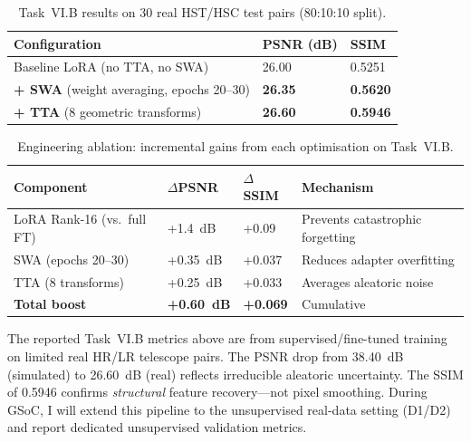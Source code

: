 \documentclass[11pt,a4paper]{article}
\begin{document}
\begin{table}[h!]
\centering
\caption{Task~VI.B results on 30 real HST/HSC test pairs (80:10:10 split).}
\label{tab:6b_main}
\begin{tabular}{L{5.5cm} C{3.0cm} C{3.0cm}}
\toprule
\textbf{Configuration} & \textbf{PSNR (dB)} & \textbf{SSIM} \\
\midrule
Baseline LoRA (no TTA, no SWA) & 26.00 & 0.5251 \\
\textbf{+ SWA} (weight averaging, epochs 20--30) & \textbf{26.35} & \textbf{0.5620} \\
\textbf{+ TTA} (8 geometric transforms) & \textbf{26.60} & \textbf{0.5946} \\
\bottomrule
\end{tabular}
\end{table}

\begin{table}[h!]
\centering
\caption{Engineering ablation: incremental gains from each optimisation on Task~VI.B.}
\label{tab:6b_ablation}
\begin{tabular}{L{4.5cm} C{2.2cm} C{2.2cm} C{3.0cm}}
\toprule
\textbf{Component} & \textbf{$\Delta$PSNR} & \textbf{$\Delta$SSIM} & \textbf{Mechanism} \\
\midrule
LoRA Rank-16 (vs.\ full FT) & +1.4~dB & +0.09 & Prevents catastrophic forgetting \\
SWA (epochs 20--30) & +0.35~dB & +0.037 & Reduces adapter overfitting \\
TTA (8 transforms) & +0.25~dB & +0.033 & Averages aleatoric noise \\
\midrule
\textbf{Total boost} & \textbf{+0.60~dB} & \textbf{+0.069} & Cumulative \\
\bottomrule
\end{tabular}
\end{table}

\begin{notebox}
\small The reported Task~VI.B metrics above are from supervised/fine-tuned training on limited real HR/LR telescope pairs. The PSNR drop from 38.40~dB (simulated) to 26.60~dB (real) reflects irreducible aleatoric uncertainty. The SSIM of 0.5946 confirms \emph{structural} feature recovery---not pixel smoothing. During GSoC, I will extend this pipeline to the unsupervised real-data setting (D1/D2) and report dedicated unsupervised validation metrics.
\end{notebox}

\vspace{6pt}
\end{document}
